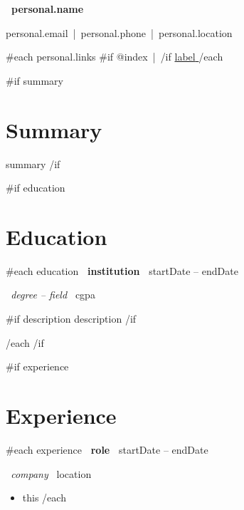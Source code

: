 \documentclass[10pt,a4paper]{article}
\begin{document}
\color{textdark}

\begin{center}
    {\Huge \textbf{\color{primary} {{~personal.name~}} } }
    \vspace{6pt}

    {\large {{personal.email}} \,|\, {{personal.phone}} \,|\, {{personal.location}} }
    \vspace{4pt}

    {{#each personal.links}}
        {{#if @index}} \,|\, {{/if}}
        \href{ {{url}} }{ \textcolor{primary}{ {{label}} } }
    {{/each}}
\end{center}

\vspace{0.5em}


{{#if summary}}
\section{Summary}
{{summary}}
{{/if}}


{{#if education}}
\section{Education}

{{#each education}}
\textbf{ {{~institution~}} } \hfill {{startDate}} -- {{endDate}}

\textit{ {{~degree}} -- {{field~}} } \hfill {{cgpa}}

{{#if description}}
{{description}}
{{/if}}

\vspace{4pt}

{{/each}}
{{/if}}


{{#if experience}}
\section{Experience}

{{#each experience}}
\textbf{ {{~role~}} } \hfill {{startDate}} -- {{endDate}}

\textit{ {{~company~}} } \hfill {{location}}

\begin{itemize}
{{#each bullets}}
    \item {{this}}
{{/each}}
\end{itemize}
\end{document}
